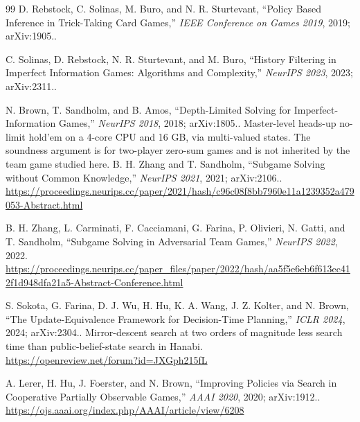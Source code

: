 \begin{thebibliography}{99}
D. Rebstock, C. Solinas, M. Buro, and N. R. Sturtevant, ``Policy Based Inference
in Trick-Taking Card Games,'' \emph{IEEE Conference on Games 2019}, 2019;
arXiv:1905..

C. Solinas, D. Rebstock, N. R. Sturtevant, and M. Buro, ``History Filtering in
Imperfect Information Games: Algorithms and Complexity,'' \emph{NeurIPS 2023},
2023; arXiv:2311..


N. Brown, T. Sandholm, and B. Amos, ``Depth-Limited Solving for
Imperfect-Information Games,'' \emph{NeurIPS 2018}, 2018; arXiv:1805..
Master-level heads-up no-limit hold'em on a 4-core CPU and 16 GB, via
multi-valued states. The soundness argument is for two-player zero-sum games and
is not inherited by the team game studied here.
B. H. Zhang and T. Sandholm, ``Subgame Solving without Common Knowledge,''
\emph{NeurIPS 2021}, 2021; arXiv:2106..\\
\url{https://proceedings.neurips.cc/paper/2021/hash/c96c08f8bb7960e11a1239352a479053-Abstract.html}

B. H. Zhang, L. Carminati, F. Cacciamani, G. Farina, P. Olivieri, N. Gatti, and
T. Sandholm, ``Subgame Solving in Adversarial Team Games,'' \emph{NeurIPS 2022},
2022.\\
\url{https://proceedings.neurips.cc/paper_files/paper/2022/hash/aa5f5e6eb6f613ec412f1d948dfa21a5-Abstract-Conference.html}

S. Sokota, G. Farina, D. J. Wu, H. Hu, K. A. Wang, J. Z. Kolter, and N. Brown,
``The Update-Equivalence Framework for Decision-Time Planning,'' \emph{ICLR
2024}, 2024; arXiv:2304.. Mirror-descent search at two orders of magnitude
less search time than public-belief-state search in Hanabi.\\
\url{https://openreview.net/forum?id=JXGph215fL}

A. Lerer, H. Hu, J. Foerster, and N. Brown, ``Improving Policies via Search in
Cooperative Partially Observable Games,'' \emph{AAAI 2020}, 2020;
arXiv:1912..\\
\url{https://ojs.aaai.org/index.php/AAAI/article/view/6208}


\end{thebibliography}
